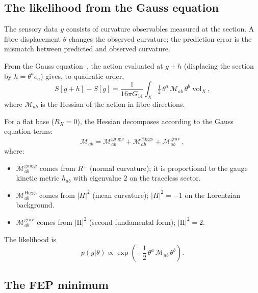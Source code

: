 \documentclass[12pt, a4paper]{article}
\theoremstyle{definition}
\theoremstyle{remark}
\begin{document}
\subsection{The likelihood from the Gauss equation}
\label{sec:likelihood}

The sensory data $y$ consists of curvature observables measured at the section.
A fibre displacement $\theta$ changes the observed curvature; the prediction error is the mismatch between predicted and observed curvature.

From the Gauss equation~\cite{Paper3}, the action evaluated at $g + h$ (displacing the section by $h = \theta^a e_a$) gives, to quadratic order,
\begin{equation}
\label{eq:action_quad}
S[g + h] - S[g] = \frac{1}{16\pi G_{14}} \int_X \tfrac{1}{2}\, \theta^a\, \mathcal{M}_{ab}\, \theta^b\; \mathrm{vol}_X\,,
\end{equation}
where $\mathcal{M}_{ab}$ is the Hessian of the action in fibre directions.

For a flat base ($R_X = 0$), the Hessian decomposes according to the Gauss equation terms:
\begin{equation}
\label{eq:hessian}
\mathcal{M}_{ab} = \mathcal{M}^{\mathrm{gauge}}_{ab} + \mathcal{M}^{\mathrm{Higgs}}_{ab} + \mathcal{M}^{\mathrm{grav}}_{ab}\,,
\end{equation}
where:
\begin{itemize}[nosep]
\item $\mathcal{M}^{\mathrm{gauge}}_{ab}$ comes from $R^\perp$ (normal curvature); it is proportional to the gauge kinetic metric $h_{ab}$ with eigenvalue $2$ on the traceless sector.
\item $\mathcal{M}^{\mathrm{Higgs}}_{ab}$ comes from $|H|^2$ (mean curvature); $|H|^2 = -1$ on the Lorentzian background.
\item $\mathcal{M}^{\mathrm{grav}}_{ab}$ comes from $|\mathrm{I\!I}|^2$ (second fundamental form); $|\mathrm{I\!I}|^2 = 2$.
\end{itemize}

The likelihood is
\begin{equation}
\label{eq:likelihood}
p(y|\theta) \propto \exp\!\left(-\frac{1}{2}\, \theta^a\, \mathcal{M}_{ab}\, \theta^b\right).
\end{equation}


\subsection{The FEP minimum}
\label{sec:fep_min}
\end{document}
